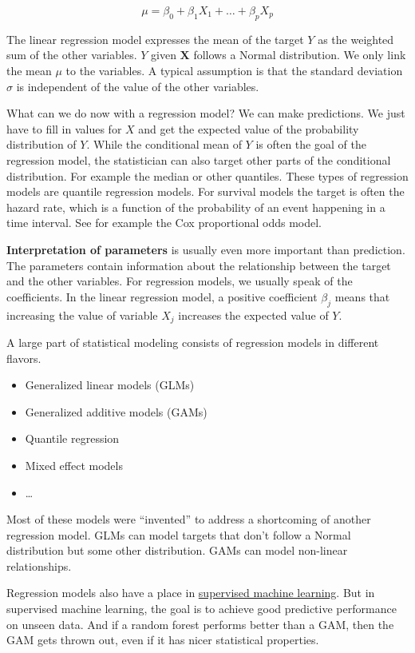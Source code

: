 \documentclass[
  10pt,
]{scrbook}
\providecommand{\tightlist}{%
  \setlength{\itemsep}{0pt}\setlength{\parskip}{0pt}}
\begin{document}
\[\mu = \beta_0 + \beta_1 X_1 + \ldots + \beta_p X_p\]

The linear regression model expresses the mean of the target \(Y\) as the weighted sum of the other variables.
\(Y\) given \(\mathbf{X}\) follows a Normal distribution.
We only link the mean \(\mu\) to the variables.
A typical assumption is that the standard deviation \(\sigma\) is independent of the value of the other variables.

What can we do now with a regression model?
We can make predictions.
We just have to fill in values for \(X\) and get the expected value of the probability distribution of \(Y\).
While the conditional mean of \(Y\) is often the goal of the regression model, the statistician can also target other parts of the conditional distribution.
For example the median or other quantiles.
These types of regression models are quantile regression models.
For survival models the target is often the hazard rate, which is a function of the probability of an event happening in a time interval.
See for example the Cox proportional odds model.

\textbf{Interpretation of parameters} is usually even more important than prediction.
The parameters contain information about the relationship between the target and the other variables.
For regression models, we usually speak of the coefficients.
In the linear regression model, a positive coefficient \(\beta_j\) means that increasing the value of variable \(X_j\) increases the expected value of \(Y\).

A large part of statistical modeling consists of regression models in different flavors.

\begin{itemize}
\tightlist
\item
  Generalized linear models (GLMs)
\item
  Generalized additive models (GAMs)
\item
  Quantile regression
\item
  Mixed effect models
\item
  \ldots{}
\end{itemize}

Most of these models were ``invented'' to address a shortcoming of another regression model.
GLMs can model targets that don't follow a Normal distribution but some other distribution.
GAMs can model non-linear relationships.

Regression models also have a place in \protect\hyperlink{supervised-ml}{supervised machine learning}.
But in supervised machine learning, the goal is to achieve good predictive performance on unseen data.
And if a random forest performs better than a GAM, then the GAM gets thrown out, even if it has nicer statistical properties.
\end{document}
